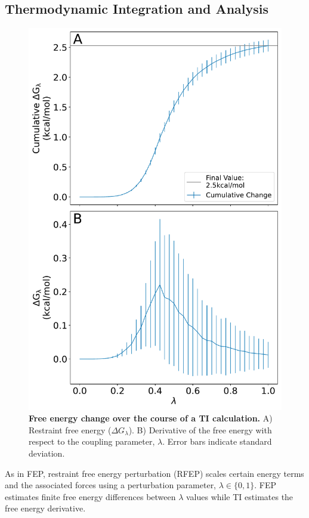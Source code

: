 \documentclass[9pt,tutorial,pubversion]{Styling/livecoms}
\begin{document}
\subsection{Thermodynamic Integration and Analysis}

\begin{figure}[!htb]
    \includegraphics[width=0.95\linewidth]{RFEP}
    \caption{ \textbf{Free energy change over the course of a TI calculation.} A) Restraint free energy ($\Delta G_\lambda$). B) Derivative of the free energy with respect to the coupling parameter, $\lambda$. Error bars indicate standard deviation.
    }\label{fig:RFEP2}
\end{figure}
As in FEP, restraint free energy perturbation (RFEP) scales certain energy terms and the associated forces using a perturbation parameter, $\lambda\in \{0,1\}$.
FEP estimates finite free energy differences between $\lambda$ values while TI estimates the free energy derivative. 
\end{document}
